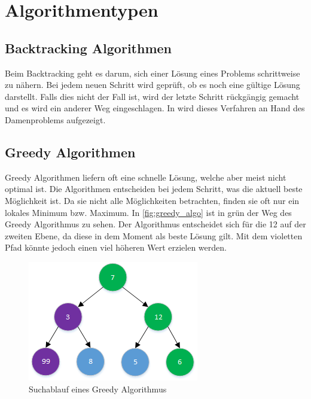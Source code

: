 \section{Algorithmentypen}\label{algo_types}

\subsection{Backtracking Algorithmen}\label{backtracking_algos}
Beim Backtracking geht es darum, sich einer Lösung eines Problems schrittweise zu nähern. Bei jedem neuen Schritt wird geprüft, ob es noch eine gültige Lösung darstellt. Falls dies nicht der Fall ist, wird der letzte Schritt rückgängig gemacht und es wird ein anderer Weg eingeschlagen. In \cite{backtracking} wird dieses Verfahren an Hand des Damenproblems aufgezeigt.

\subsection{Greedy Algorithmen}\label{greedy_algos}
Greedy Algorithmen liefern oft eine schnelle Lösung, welche aber meist nicht optimal ist. Die Algorithmen entscheiden bei jedem Schritt, was die aktuell beste Möglichkeit ist. Da sie nicht alle Möglichkeiten betrachten, finden sie oft nur ein lokales Minimum bzw. Maximum. In \autoref{fig:greedy_algo} ist in grün der Weg des Greedy Algorithmus zu sehen. Der Algorithmus entscheidet sich für die 12 auf der zweiten Ebene, da diese in dem Moment als beste Lösung gilt. Mit dem violetten Pfad könnte jedoch einen viel höheren Wert erzielen werden.

\begin{figure}[h]
\centering 
\includegraphics[scale=1]{images/einleitung/greedy_algo.png}
\caption[Suchablauf eines Greedy Algorithmus]{Suchablauf eines Greedy Algorithmus \cite{pic_greedy_algo}}
\label{fig:greedy_algo}
\end{figure}

